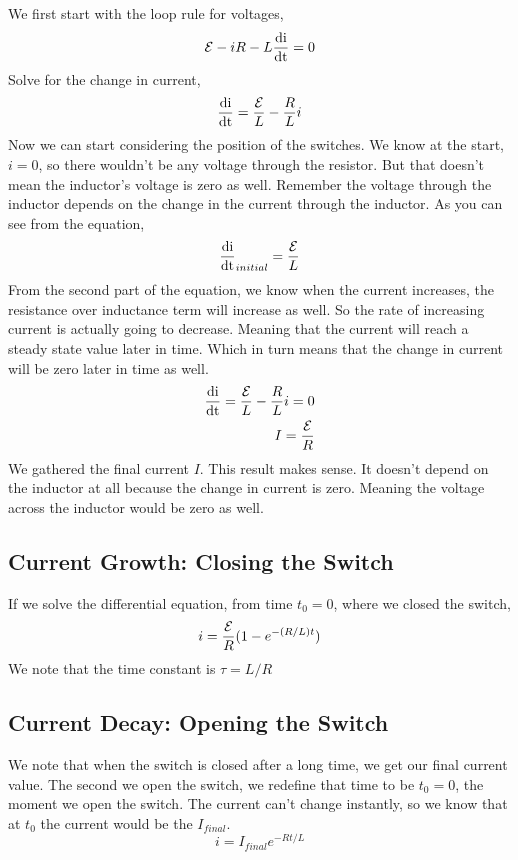 We first start with the loop rule for voltages, 
\begin{equation*}
	\mathcal{E} - iR - L\frac{\mathrm{d i}}{\mathrm{d t}} = 0
\end{equation*}
Solve for the change in current, 
\begin{equation*}
	\frac{\mathrm{d i}}{\mathrm{d t}} = \frac{\mathcal{E}}{L} - \frac{R}{L}i
\end{equation*}
Now we can start considering the position of the switches. We know at the start, $i=0$, so there wouldn't be any voltage through the resistor. But that doesn't mean the inductor's voltage is zero as well. Remember the voltage through the inductor depends on the change in the current through the inductor. As you can see from the equation, 
\begin{equation*}
	\frac{\mathrm{d i}}{\mathrm{d t}}_{initial} = \frac{\mathcal{E}}{L}
\end{equation*}
From the second part of the equation, we know when the current increases, the resistance over inductance term will increase as well. So the rate of increasing current is actually going to decrease. Meaning that the current will reach a steady state value later in time. Which in turn means that the change in current will be zero later in time as well.
\begin{align*}
	\frac{\mathrm{d i}}{\mathrm{d t}} = \frac{\mathcal{E}}{L} - \frac{R}{L}i = 0 \\ 
	I = \frac{\mathcal{E}}{R}
\end{align*}
We gathered the final current $I$. This result makes sense. It doesn't depend on the inductor at all because the change in current is zero. Meaning the voltage across the inductor would be zero as well. 


\subsection{Current Growth: Closing the Switch}
If we solve the differential equation, from time $t_0 = 0$, where we closed the switch,
\begin{equation*}
	i = \frac{\mathcal{E}}{R}(1-e^{-(R/L)t})
\end{equation*}
We note that the time constant is $\tau=L/R$

\subsection{Current Decay: Opening the Switch}
We note that when the switch is closed after a long time, we get our final current value. The second we open the switch, we redefine that time to be $t_0 = 0$, the moment we open the switch. The current can't change instantly, so we know that at $t_0$ the current would be the $I_{final}$.
\begin{equation*}
	i = I_{final}e^{-Rt/L}
\end{equation*}

